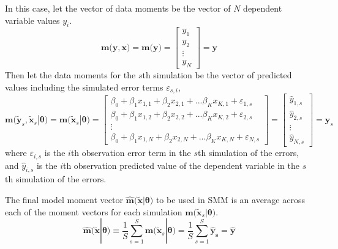 \documentclass[letterpaper,12pt]{article}
\theoremstyle{definition}
\newcommand\ve{\varepsilon}
\begin{document}
    In this case, let the vector of data moments be the vector of $N$ dependent variable values $y_i$.
    \begin{equation}\label{EqLinRegSMMDataMoms2}
      \bm{m}\bigl(\bm{y},\bm{x}\bigr) = \bm{m}\bigl(\bm{y}\bigr) =
        \begin{bmatrix}
          y_1 \\ y_2 \\ \vdots \\ y_N
        \end{bmatrix} = \bm{y}
    \end{equation}
    Then let the data moments for the $s$th simulation be the vector of predicted values including the simulated error terms $\ve_{s,i}$,
    \begin{equation}\label{EqSMMlinregsimmodmoms2}
      \bm{m}\bigl(\bm{\tilde{y}}_s,\bm{\tilde{x}}_s|\bm{\theta}\bigr) = \bm{m}\bigl(\bm{\tilde{x}}_s|\bm{\theta}\bigr) =
        \begin{bmatrix}
          \beta_0 + \beta_1 x_{1,1} + \beta_2 x_{2,1} + ... \beta_K x_{K,1} + \ve_{1,s} \\
          \beta_0 + \beta_1 x_{1,2} + \beta_2 x_{2,2} + ... \beta_K x_{K,2} + \ve_{2,s} \\
          \vdots \\
          \beta_0 + \beta_1 x_{1,N} + \beta_2 x_{2,N} + ... \beta_K x_{K,N} + \ve_{N,s}
        \end{bmatrix} =
        \begin{bmatrix}
          \hat{y}_{1,s} \\ \hat{y}_{2,s} \\ \vdots \\ \hat{y}_{N,s}
        \end{bmatrix} = \bm{\hat{y}}_s
    \end{equation}
    where $\ve_{i,s}$ is the $i$th observation error term in the $s$th simulation of the errors, and $\hat{y}_{i,s}$ is the $i$th observation predicted value of the dependent variable in the $s$th simulation of the errors.

    The final model moment vector $\bm{\hat{m}}\bigl(\bm{\tilde{x}}|\bm{\theta}\bigr)$ to be used in SMM is an average across each of the moment vectors for each simulation $\bm{m}\bigl(\bm{\tilde{x}}_s|\bm{\theta}\bigr)$.
    \begin{equation}\label{EqSMMmodmomgenlinreg2}
      \bm{\hat{m}}\bigl(\bm{\tilde{x}}|\bm{\theta}\bigr) \equiv \frac{1}{S}\sum_{s=1}^S\bm{m}\bigl(\bm{\tilde{x}}_s|\bm{\theta}\bigr) = \frac{1}{S}\sum_{s=1}^S\bm{\hat{y}_s} = \bm{\hat{y}}
    \end{equation}
\end{document}
